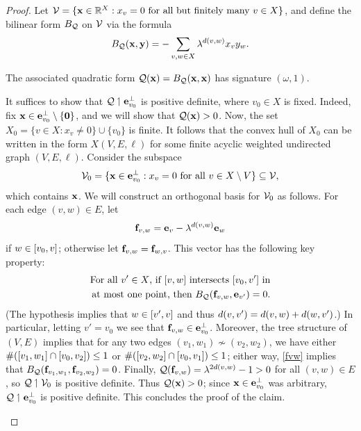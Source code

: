 \begin{proof}
Let $\VV = \{\xx\in\R^X : x_v = 0 \text{ for all but finitely many $v\in X$}\}$, and define the bilinear form $B_\mathcal Q$ on $\mathcal V$ via the formula
\begin{equation}
\label{BIMdef}
B_\mathcal Q(\mathbf x,\mathbf y) = -\sum_{v,w\in X} \lambda^{d(v,w)} x_v y_w.
\end{equation}
\begin{claim}
The associated quadratic form $\mathcal Q(\mathbf x) = B_\mathcal Q(\mathbf x,\mathbf x)$ has signature $(\omega,1)$.
\end{claim}
\begin{subproof}
It suffices to show that $\mathcal Q\upharpoonleft \mathbf e_{v_0}^\perp$ is positive definite, where $v_0\in X$ is fixed. Indeed, fix $\mathbf x\in\mathbf e_{v_0}^\perp\setminus\{\mathbf 0\}$, and we will show that $\mathcal Q(\mathbf x) > 0$. Now, the set $X_0 = \{v\in X : x_v\neq 0\}\cup\{v_0\}$ is finite. It follows that the convex hull of $X_0$ can be written in the form $X(V,E,\ell)$ for some finite acyclic weighted undirected graph $(V,E,\ell)$. Consider the subspace
\[
\mathcal V_0 = \{\mathbf x\in\mathbf e_{v_0}^\perp : x_v = 0 \textup{ for all $v\in X\setminus V$}\} \subseteq \mathcal V,
\]
which contains $\mathbf x$. We will construct an orthogonal basis for $\mathcal V_0$ as follows. For each edge $(v,w)\in E$, let
\[
\mathbf f_{v,w} = \mathbf e_v - \lambda^{d(v,w)} \mathbf e_w
\]
if $w\in [v_0,v]$; otherwise let $\mathbf f_{v,w} = \mathbf f_{w,v}$. This vector has the following key property:
\begin{equation}
\label{fvw}
\begin{split}
\textup{For all $v'\in X$, if $[v,w]$ intersects $[v_0,v']$ in}\\ 
\textup{at most one point, then $B_\mathcal Q(\mathbf f_{v,w},\mathbf e_{v'}) = 0$.}
\end{split}
\end{equation}
(The hypothesis implies that $w\in [v',v]$ and thus $d(v,v') = d(v,w) + d(w,v')$.) In particular, letting $v' = v_0$ we see that $\mathbf f_{v,w}\in \mathbf e_{v_0}^\perp$. Moreover, the tree structure of $(V,E)$ implies that for any two edges $(v_1,w_1)\not\sim (v_2,w_2)$, we have either $\#([v_1,w_1]\cap[v_0,v_2]) \leq 1$ or $\#([v_2,w_2]\cap[v_0,v_1]) \leq 1$; either way, \eqref{fvw} implies that $B_\mathcal Q(\mathbf f_{v_1,w_1},\mathbf f_{v_2,w_2}) = 0$. Finally, $\mathcal Q(\mathbf f_{v,w}) = \lambda^{2d(v,w)} - 1 > 0$ for all $(v,w)\in E$, so $\mathcal Q\upharpoonleft \mathcal V_0$ is positive definite. Thus $\mathcal Q(\mathbf x) > 0$; since $\mathbf x\in\mathbf e_{v_0}^\perp$ was arbitrary, $\mathcal Q\upharpoonleft \mathbf e_{v_0}^\perp$ is positive definite. This concludes the proof of the claim.
\end{subproof}

\end{proof}
